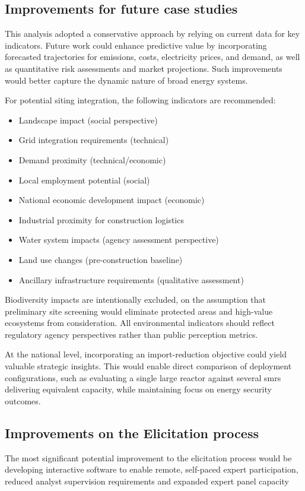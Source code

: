 \subsection{Improvements for future case studies}
This analysis adopted a conservative approach by relying on current data for key indicators. Future work could enhance predictive value by incorporating forecasted trajectories for emissions, costs, electricity prices, and demand, as well as quantitative risk assessments and market projections. Such improvements would better capture the dynamic nature of broad energy systems.

For potential siting integration, the following indicators are recommended:

\begin{itemize}
    \item Landscape impact (social perspective)
    \item Grid integration requirements (technical)
    \item Demand proximity (technical/economic)
    \item Local employment potential (social)
    \item National economic development impact (economic)
    \item Industrial proximity for construction logistics
    \item Water system impacts (agency assessment perspective)
    \item Land use changes (pre-construction baseline)
    \item Ancillary infrastructure requirements (qualitative assessment)
\end{itemize}

Biodiversity impacts are intentionally excluded, on the assumption that preliminary site screening would eliminate protected areas and high-value ecosystems from consideration. All environmental indicators should reflect regulatory agency perspectives rather than public perception metrics.

At the national level, incorporating an import-reduction objective could yield valuable strategic insights. This would enable direct comparison of deployment configurations, such as evaluating a single large reactor against several \glspl{smr} delivering equivalent capacity, while maintaining focus on energy security outcomes.

\subsection{Improvements on the Elicitation process}
The most significant potential improvement to the elicitation process would be developing interactive software to enable remote, self-paced expert participation, reduced analyst supervision requirements and expanded expert panel capacity

